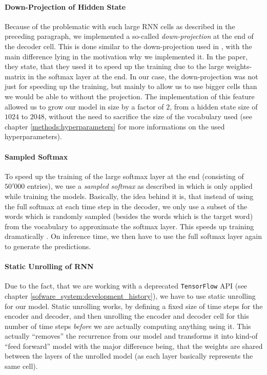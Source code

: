 \paragraph{Down-Projection of Hidden State} Because of the problematic with such large RNN cells as described in the preceding paragraph, we implemented a so-called \emph{down-projection} at the end of the decoder cell. This is done similar to the down-projection used in \cite{Vinyals:2015}, with the main difference lying in the motivation why we implemented it. In the paper, they state, that they used it to speed up the training due to the large weights-matrix in the softmax layer at the end. In our case, the down-projection was not just for speeding up the training, but mainly to allow us to use bigger cells than we would be able to without the projection. The implementation of this feature allowed us to grow our model in size by a factor of $2$, from a hidden state size of $1024$ to $2048$, without the need to sacrifice the size of the vocabulary used (see chapter \ref{methods:hyperparameters} for more informations on the used hyperparameters).

\paragraph{Sampled Softmax} To speed up the training of the large softmax layer at the end (consisting of $50'000$ entries), we use a \emph{sampled softmax} as described in \cite{Sebastien:2014} which is only applied while training the models. Basically, the idea behind it is, that instead of using the full softmax at each time step in the decoder, we only use a subset of the words which is randomly sampled (besides the words which is the target word) from the vocabulary to approximate the softmax layer. This speeds up training dramatically . On inference time, we then have to use the full softmax layer again to generate the predictions.

\paragraph{Static Unrolling of RNN} Due to the fact, that we are working with a deprecated \texttt{TensorFlow} API (see chapter \ref{sofware_system:development_history}), we have to use static unrolling for our model. Static unrolling works, by defining a fixed size of time steps for the encoder and decoder, and then unrolling the encoder and decoder cell for this number of time steps \emph{before} we are actually computing anything using it. This actually ``removes'' the recurrence from our model and transforms it into kind-of ``feed forward'' model with the major difference being, that the weights are shared between the layers of the unrolled model (as each layer basically represents the same cell).

